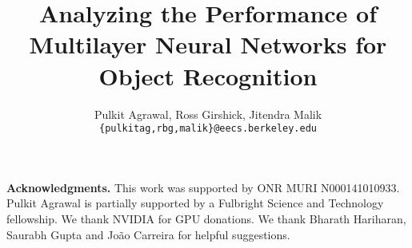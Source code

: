 \documentclass[runningheads]{llncs}
\begin{document}
\pagestyle{headings}
\mainmatter
\title{Analyzing the Performance of Multilayer Neural Networks for Object Recognition} %




\author{Pulkit Agrawal, Ross Girshick, Jitendra Malik\\
\texttt{\small \{pulkitag,rbg,malik\}@eecs.berkeley.edu}}


\maketitle





%
%




{\small
\smallskip
\noindent \textbf{Acknowledgments.}
This work was supported by ONR MURI N000141010933.
Pulkit Agrawal is partially supported by a Fulbright Science and Technology fellowship.
We thank NVIDIA for GPU donations.
We thank Bharath Hariharan, Saurabh Gupta and Jo\~{a}o Carreira for helpful suggestions.}





\end{document}
